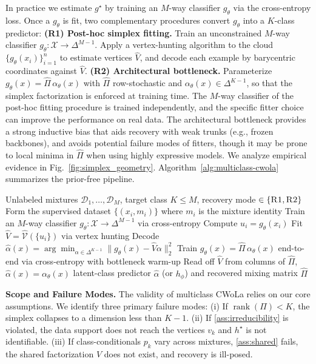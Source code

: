 \documentclass{article}
\theoremstyle{plain}
\theoremstyle{definition}
\theoremstyle{remark}
\newcommand{\X}{\mathcal{X}}
\newcommand{\D}{\mathcal{D}}
\DeclareMathOperator{\rank}{rank}
\begin{document}
In practice we estimate $g^\star$ by training an $M$-way classifier $g_\theta$ via the cross-entropy loss. Once a $g_\theta$ is fit, two complementary procedures convert $g_\theta$ into a $K$-class predictor:\newline
\textbf{(R1) Post-hoc simplex fitting.} Train an unconstrained $M$-way classifier $g_\theta:\X\to\Delta^{M-1}$. Apply a vertex-hunting algorithm to the cloud $\{g_\theta(x_i)\}_{i=1}^n$ to estimate vertices $\hat V$, and decode each example by barycentric coordinates against $\hat V$. \newline
\textbf{(R2) Architectural bottleneck.} Parameterize $g_\theta(x)=\hat\Pi\,\alpha_\theta(x)$ with $\hat\Pi$ row-stochastic and $\alpha_\theta(x)\in\Delta^{K-1}$, so that the simplex factorization is enforced at training time.\newline
The $M$-way classifier of the post-hoc fitting procedure is trained independently, and the specific fitter choice can improve the performance on real data. The architectural bottleneck provides a strong inductive bias that aids recovery with weak trunks (e.g., frozen backbones), and avoids potential failure modes of fitters, though it may be prone to local minima in $\hat\Pi$ when using highly expressive models. We analyze empirical evidence in Fig.~\ref{fig:simplex_geometry}. Algorithm~\ref{alg:multiclass-cwola} summarizes the prior-free pipeline. \newline
\begin{algorithm}[t]
\caption{Multiclass CWoLa}
\label{alg:multiclass-cwola}
\begin{algorithmic}[1]
\Require Unlabeled mixtures $\D_1,\ldots,\D_M$, target class $K\le M$, recovery mode $\in\{\textsc{R1},\textsc{R2}\}$
\State Form the supervised dataset $\{(x_i,m_i)\}$ where $m_i$ is the mixture identity
    \State Train an $M$-way classifier $g_\theta:\X\to\Delta^{M-1}$ via cross-entropy
    \State Compute $u_i=g_\theta(x_i)$
    \State Fit $\hat V=\widehat{\mathcal{V}}(\{u_i\})$ via vertex hunting 
    \State Decode $\hat\alpha(x)=\arg\min_{\alpha\in\Delta^{K-1}}\|g_\theta(x)-\hat V\alpha\|_2^2$
    \State Train $g_\theta(x)=\hat\Pi\,\alpha_\theta(x)$ end-to-end via cross-entropy with bottleneck warm-up
    \State Read off $\hat V$ from columns of $\hat\Pi$, $\hat\alpha(x)=\alpha_\theta(x)$
\EndIf
\State \Return latent-class predictor $\hat\alpha$ (or $h_\phi$) and recovered mixing matrix $\hat\Pi$
\end{algorithmic}
\end{algorithm}
\textbf{Scope and Failure Modes.} The validity of multiclass CWoLa relies on our core assumptions. We identify three primary failure modes:
(i) If $\rank(\Pi) < K$, the simplex collapses to a dimension less than $K-1$.
(ii) If \ref{ass:irreducibility} is violated, the data support does not reach the vertices $v_k$ and $h^\star$ is not identifiable.
(iii) If class-conditionals $p_k$ vary across mixtures, \ref{ass:shared} fails, the shared factorization $V$ does not exist, and recovery is ill-posed. 
\end{document}
